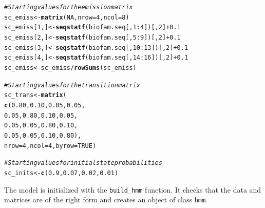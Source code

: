 \documentclass[12pt]{article}\usepackage[]{graphicx}\usepackage[]{color}
\makeatletter
\newcommand{\hlnum}[1]{\textcolor[rgb]{0.686,0.059,0.569}{#1}}%
\newcommand{\hlcom}[1]{\textcolor[rgb]{0.678,0.584,0.686}{\textit{#1}}}%
\newcommand{\hlopt}[1]{\textcolor[rgb]{0,0,0}{#1}}%
\newcommand{\hlstd}[1]{\textcolor[rgb]{0.345,0.345,0.345}{#1}}%
\newcommand{\hlkwb}[1]{\textcolor[rgb]{0.69,0.353,0.396}{#1}}%
\newcommand{\hlkwc}[1]{\textcolor[rgb]{0.333,0.667,0.333}{#1}}%
\newcommand{\hlkwd}[1]{\textcolor[rgb]{0.737,0.353,0.396}{\textbf{#1}}}%
\newenvironment{kframe}{%
 \def\at@end@of@kframe{}%
 \ifinner\ifhmode%
  \def\at@end@of@kframe{\end{minipage}}%
  \begin{minipage}{\columnwidth}%
 \fi\fi%
 \def\FrameCommand##1{\hskip\@totalleftmargin \hskip-\fboxsep
 \colorbox{shadecolor}{##1}\hskip-\fboxsep
     \hskip-\linewidth \hskip-\@totalleftmargin \hskip\columnwidth}%
 \MakeFramed {\advance\hsize-\width
   \@totalleftmargin\z@ \linewidth\hsize
   \@setminipage}}%
 {\par\unskip\endMakeFramed%
 \at@end@of@kframe}
\newenvironment{knitrout}{}{} %
\makeatother
\begin{document}
\begin{knitrout}
\color{fgcolor}\begin{kframe}
\begin{alltt}
\hlcom{# Starting values for the emission matrix}
\hlstd{sc_emiss} \hlkwb{<-} \hlkwd{matrix}\hlstd{(}\hlnum{NA}\hlstd{,} \hlkwc{nrow} \hlstd{=} \hlnum{4}\hlstd{,} \hlkwc{ncol} \hlstd{=} \hlnum{8}\hlstd{)}
\hlstd{sc_emiss[}\hlnum{1}\hlstd{,]} \hlkwb{<-} \hlkwd{seqstatf}\hlstd{(biofam.seq[,} \hlnum{1}\hlopt{:}\hlnum{4}\hlstd{])[,} \hlnum{2}\hlstd{]} \hlopt{+} \hlnum{0.1}
\hlstd{sc_emiss[}\hlnum{2}\hlstd{,]} \hlkwb{<-} \hlkwd{seqstatf}\hlstd{(biofam.seq[,} \hlnum{5}\hlopt{:}\hlnum{9}\hlstd{])[,} \hlnum{2}\hlstd{]} \hlopt{+} \hlnum{0.1}
\hlstd{sc_emiss[}\hlnum{3}\hlstd{,]} \hlkwb{<-} \hlkwd{seqstatf}\hlstd{(biofam.seq[,} \hlnum{10}\hlopt{:}\hlnum{13}\hlstd{])[,} \hlnum{2}\hlstd{]} \hlopt{+} \hlnum{0.1}
\hlstd{sc_emiss[}\hlnum{4}\hlstd{,]} \hlkwb{<-} \hlkwd{seqstatf}\hlstd{(biofam.seq[,} \hlnum{14}\hlopt{:}\hlnum{16}\hlstd{])[,} \hlnum{2}\hlstd{]} \hlopt{+} \hlnum{0.1}
\hlstd{sc_emiss} \hlkwb{<-} \hlstd{sc_emiss} \hlopt{/} \hlkwd{rowSums}\hlstd{(sc_emiss)}

\hlcom{# Starting values for the transition matrix}
\hlstd{sc_trans} \hlkwb{<-} \hlkwd{matrix}\hlstd{(}
  \hlkwd{c}\hlstd{(}\hlnum{0.80}\hlstd{,} \hlnum{0.10}\hlstd{,} \hlnum{0.05}\hlstd{,} \hlnum{0.05}\hlstd{,}
    \hlnum{0.05}\hlstd{,} \hlnum{0.80}\hlstd{,} \hlnum{0.10}\hlstd{,} \hlnum{0.05}\hlstd{,}
    \hlnum{0.05}\hlstd{,} \hlnum{0.05}\hlstd{,} \hlnum{0.80}\hlstd{,} \hlnum{0.10}\hlstd{,}
    \hlnum{0.05}\hlstd{,} \hlnum{0.05}\hlstd{,} \hlnum{0.10}\hlstd{,} \hlnum{0.80}\hlstd{),}
  \hlkwc{nrow} \hlstd{=} \hlnum{4}\hlstd{,} \hlkwc{ncol} \hlstd{=} \hlnum{4}\hlstd{,} \hlkwc{byrow} \hlstd{=} \hlnum{TRUE}\hlstd{)}

\hlcom{# Starting values for initial state probabilities}
\hlstd{sc_inits} \hlkwb{<-} \hlkwd{c}\hlstd{(}\hlnum{0.9}\hlstd{,} \hlnum{0.07}\hlstd{,} \hlnum{0.02}\hlstd{,} \hlnum{0.01}\hlstd{)}
\end{alltt}
\end{kframe}
\end{knitrout}
The model is initialized with the \texttt{build\_hmm} function. It checks that the data and matrices are of the right form and creates an object of class \texttt{hmm}.
\end{document}
